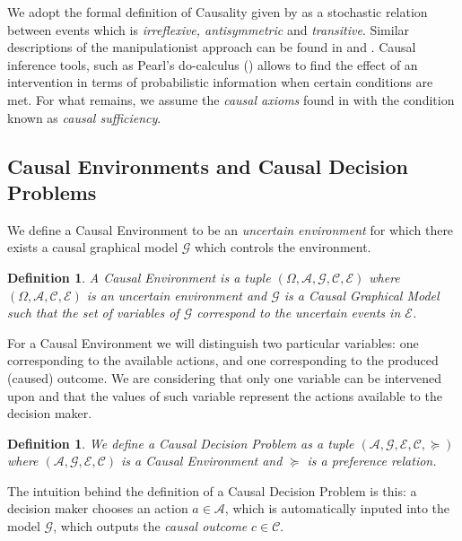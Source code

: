 \documentclass{article}
\theoremstyle{plain}
\newtheorem{defi}[teo]{Definition}
\begin{document}
We adopt the formal definition of Causality given by \cite{spirtes2000causation} as a stochastic relation between events which is \textit{irreflexive, antisymmetric} and \textit{transitive}. Similar descriptions of the manipulationist approach can be found in \cite{holland1986statistics} and \cite{freedman1997association}. Causal inference tools, such as Pearl's do-calculus (\cite{pearl2009causality}) allows to find the effect of an intervention in terms of probabilistic information when certain conditions are met. For what remains, we assume the \textit{causal axioms} found in \cite{spirtes2000causation} with the condition known as \textit{causal sufficiency}.
\subsection{Causal Environments and Causal Decision Problems}
We define a Causal Environment to be an \textit{uncertain environment} for which there exists a causal graphical model $\mathcal{G}$ which controls the environment.
\begin{defi}
A Causal Environment is a tuple $(\Omega, \mathcal{A},\mathcal{G},\mathcal{C},\mathcal{E})$ where $(\Omega, \mathcal{A},\mathcal{C},\mathcal{E})$ is an uncertain environment and $\mathcal{G}$ is a Causal Graphical Model such that the set of variables of $\mathcal{G}$ correspond to the uncertain events in $\mathcal{E}$.
\end{defi}
For a Causal Environment we will distinguish two particular variables: one corresponding to the available actions, and one corresponding to the produced (caused) outcome. We are considering that only one variable can be intervened upon and that the values of such variable represent the actions available to the decision maker.
\begin{defi}
We define a Causal Decision Problem as a tuple $(\mathcal{A}, \mathcal{G},\mathcal{E},\mathcal{C},\succeq)$ where $(\mathcal{A}, \mathcal{G},\mathcal{E},\mathcal{C})$ is a Causal Environment and $\succeq$ is a preference relation. 
\end{defi}
The intuition behind the definition of a Causal Decision Problem is this: a decision maker chooses an action $a \in \mathcal{A}$, which is automatically inputed into the model $\mathcal{G}$, which outputs the \textit{causal outcome} $c \in \mathcal{C}$.
\end{document}
